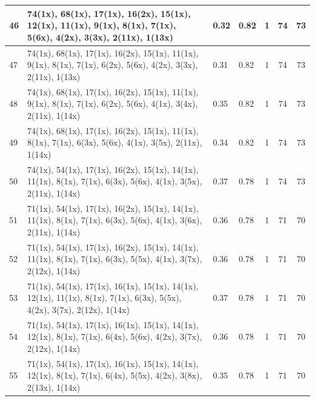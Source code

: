\begin{small}
\begin{longtable}{|p{0.5cm}|p{9cm}|p{1.3cm}|p{1.3cm}|c|c|c|}
  46 & 74(1x), 68(1x), 17(1x), 16(2x), 15(1x), 12(1x), 11(1x), 9(1x), 8(1x), 7(1x), 5(6x), 4(2x), 3(3x), 2(11x), 1(13x) & \cellcolor{colorGood}  0.32 & \cellcolor{colorGood} 0.82 & 1 & 74 & \cellcolor{colorBad} 73 \\   \hline
  47 & 74(1x), 68(1x), 17(1x), 16(2x), 15(1x), 11(1x), 9(1x), 8(1x), 7(1x), 6(2x), 5(6x), 4(2x), 3(3x), 2(11x), 1(13x) & \cellcolor{colorGood}  0.31 & \cellcolor{colorGood} 0.82 & 1 & 74 & \cellcolor{colorBad} 73 \\   \hline
  48 & 74(1x), 68(1x), 17(1x), 16(2x), 15(1x), 11(1x), 9(1x), 8(1x), 7(1x), 6(2x), 5(6x), 4(1x), 3(4x), 2(11x), 1(14x) & \cellcolor{colorGood}  0.35 & \cellcolor{colorGood} 0.82 & 1 & 74 & \cellcolor{colorBad} 73 \\   \hline
  49 & 74(1x), 68(1x), 17(1x), 16(2x), 15(1x), 11(1x), 8(1x), 7(1x), 6(3x), 5(6x), 4(1x), 3(5x), 2(11x), 1(14x) & \cellcolor{colorGood}  0.34 & \cellcolor{colorGood} 0.82 & 1 & 74 & \cellcolor{colorBad} 73 \\   \hline
  50 & 74(1x), 54(1x), 17(1x), 16(2x), 15(1x), 14(1x), 11(1x), 8(1x), 7(1x), 6(3x), 5(6x), 4(1x), 3(5x), 2(11x), 1(14x) & \cellcolor{colorGood}  0.37 & \cellcolor{colorGood} 0.78 & 1 & 74 & \cellcolor{colorBad} 73 \\   \hline
  51 & 71(1x), 54(1x), 17(1x), 16(2x), 15(1x), 14(1x), 11(1x), 8(1x), 7(1x), 6(3x), 5(6x), 4(1x), 3(6x), 2(11x), 1(14x) & \cellcolor{colorGood}  0.36 & \cellcolor{colorGood} 0.78 & 1 & 71 & \cellcolor{colorBad} 70 \\   \hline
  52 & 71(1x), 54(1x), 17(1x), 16(2x), 15(1x), 14(1x), 11(1x), 8(1x), 7(1x), 6(3x), 5(5x), 4(1x), 3(7x), 2(12x), 1(14x) & \cellcolor{colorGood}  0.36 & \cellcolor{colorGood} 0.78 & 1 & 71 & \cellcolor{colorBad} 70 \\   \hline
  53 & 71(1x), 54(1x), 17(1x), 16(1x), 15(1x), 14(1x), 12(1x), 11(1x), 8(1x), 7(1x), 6(3x), 5(5x), 4(2x), 3(7x), 2(12x), 1(14x) & \cellcolor{colorGood}  0.37 & \cellcolor{colorGood} 0.78 & 1 & 71 & \cellcolor{colorBad} 70 \\   \hline
  54 & 71(1x), 54(1x), 17(1x), 16(1x), 15(1x), 14(1x), 12(1x), 8(1x), 7(1x), 6(4x), 5(6x), 4(2x), 3(7x), 2(12x), 1(14x) & \cellcolor{colorGood}  0.36 & \cellcolor{colorGood} 0.78 & 1 & 71 & \cellcolor{colorBad} 70 \\   \hline
  55 & 71(1x), 54(1x), 17(1x), 16(1x), 15(1x), 14(1x), 12(1x), 8(1x), 7(1x), 6(4x), 5(5x), 4(2x), 3(8x), 2(13x), 1(14x) & \cellcolor{colorGood}  0.35 & \cellcolor{colorGood} 0.78 & 1 & 71 & \cellcolor{colorBad} 70 \\   \hline

\end{longtable}
\end{small}
